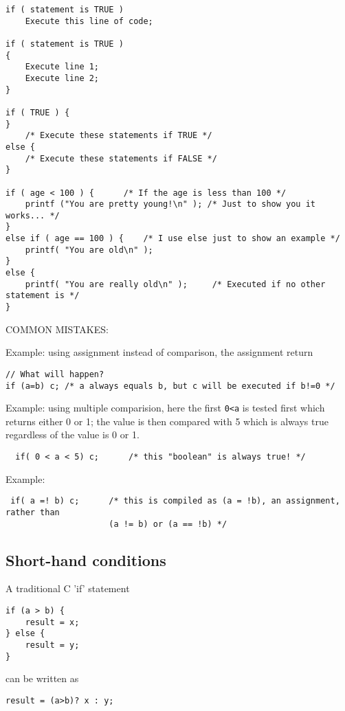 \begin{lstlisting}
if ( statement is TRUE )
    Execute this line of code;

if ( statement is TRUE ) 
{
    Execute line 1;
    Execute line 2;
}
   
if ( TRUE ) {
}
    /* Execute these statements if TRUE */
else {
    /* Execute these statements if FALSE */
}

if ( age < 100 ) {      /* If the age is less than 100 */
    printf ("You are pretty young!\n" ); /* Just to show you it works... */
}
else if ( age == 100 ) {    /* I use else just to show an example */ 
    printf( "You are old\n" );   
}
else {
    printf( "You are really old\n" );     /* Executed if no other statement is */
}
\end{lstlisting}

COMMON MISTAKES:

Example: using assignment instead of comparison, the assignment return 
\begin{verbatim}
// What will happen?
if (a=b) c; /* a always equals b, but c will be executed if b!=0 */
\end{verbatim}


Example: using multiple comparision, here the first \verb!0<a! is tested first
which returns either 0 or 1; the value is then compared with 5 which is always
true regardless of the value is 0 or 1.
\begin{verbatim}
  if( 0 < a < 5) c;      /* this "boolean" is always true! */
\end{verbatim}

Example:
\begin{verbatim}
 if( a =! b) c;      /* this is compiled as (a = !b), an assignment, rather than
                     (a != b) or (a == !b) */
\end{verbatim}



\subsection{Short-hand conditions}

A traditional C 'if' statement
\begin{verbatim}
if (a > b) {
    result = x;
} else {
    result = y;
}
\end{verbatim}
can be written as
\begin{verbatim}
result = (a>b)? x : y;
\end{verbatim}

